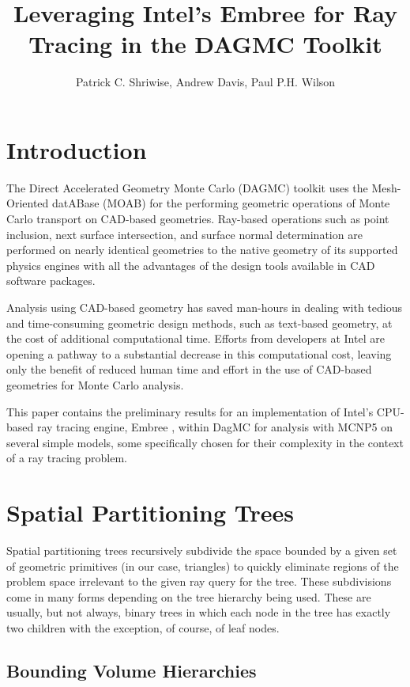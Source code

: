 \documentclass{anstrans}
\title{Leveraging Intel's Embree for Ray Tracing in the DAGMC Toolkit}
\author{Patrick C. Shriwise, Andrew Davis, Paul P.H. Wilson}
\institute{Department of Engineering Physics, University of Wisconsin-Madison, 1500 Engineering Dr, Madison, WI 53706, shriwise@wisc.edu}
\begin{document}
\section{Introduction}

The Direct Accelerated Geometry Monte Carlo (DAGMC) \cite{dagmc_2009} toolkit uses the Mesh-Oriented datABase (MOAB) \cite{moab} for the performing geometric operations of Monte Carlo transport on CAD-based geometries. Ray-based operations such as point inclusion, next surface intersection, and surface normal determination are performed on nearly identical geometries to the native geometry of its supported physics engines with all the advantages of the design tools available in CAD software packages.

Analysis using CAD-based geometry has saved man-hours in dealing with tedious and time-consuming geometric design methods, such as text-based geometry, at the cost of additional computational time. Efforts from developers at Intel are opening a pathway to a substantial decrease in this computational cost, leaving only the benefit of reduced human time and effort in the use of CAD-based geometries for Monte Carlo analysis. 

This paper contains the preliminary results for an implementation of Intel's CPU-based ray tracing engine, Embree \cite{embree}, within DagMC for analysis with MCNP5 \cite{mcnp5} on several simple models, some specifically chosen for their complexity in the context of a ray tracing problem.

\section{Spatial Partitioning Trees}

Spatial partitioning trees recursively subdivide the space bounded by a given set of geometric primitives (in our case, triangles) to quickly eliminate regions of the problem space irrelevant to the given ray query for the tree. These subdivisions come in many forms depending on the tree hierarchy being used. These are usually, but not always, binary trees in which each node in the tree has exactly two children with the exception, of course, of leaf nodes.

\subsection{Bounding Volume Hierarchies}
\end{document}
